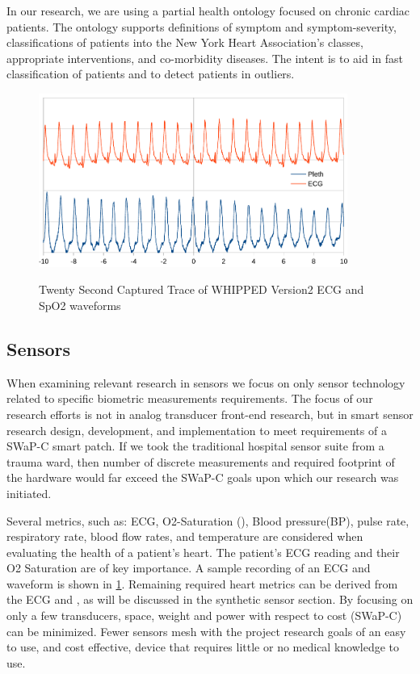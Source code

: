 In our research, we are using a partial health ontology focused on chronic cardiac patients. The ontology supports definitions of symptom and symptom-severity, classifications of patients into the New York Heart Association's classes, appropriate interventions, and co-morbidity diseases. The intent is to aid in fast classification of patients and to detect patients in outliers.


\begin{figure}
	\begin{center}
		\label{fig:20SecondEcg}
		\includegraphics[scale=1,width=0.9\textwidth]{Images/20second.pdf} 
		\caption{Twenty Second Captured Trace of WHIPPED Version2 ECG and SpO2 waveforms}
	\end{center}
\end{figure}


\subsection{Sensors}
\label{subsec:Sensors}
When examining relevant research in sensors we focus on only sensor technology related to specific biometric measurements requirements. The focus of our research efforts is not in analog transducer front-end research, but in smart sensor research design, development, and implementation to meet requirements of a SWaP-C smart patch. If we took the traditional hospital sensor suite from a trauma ward, then number of discrete measurements and required footprint of the hardware would far exceed the SWaP-C goals upon which our research was initiated.

Several metrics, such as: ECG, O2-Saturation (), Blood pressure(BP), pulse rate, respiratory rate, blood flow rates, and temperature are considered when evaluating the health of a patient's heart. The patient's ECG reading and their O2 Saturation are of key importance. A sample recording of an ECG and  waveform is shown in \ref{fig:20SecondEcg}. Remaining required heart metrics can be derived from the ECG and , as will be discussed in the synthetic sensor section. By focusing on only a few transducers, space, weight and power with respect to cost (SWaP-C) can be minimized. Fewer sensors mesh with the project research goals of an easy to use, and cost effective, device that requires little or no medical knowledge to use.

